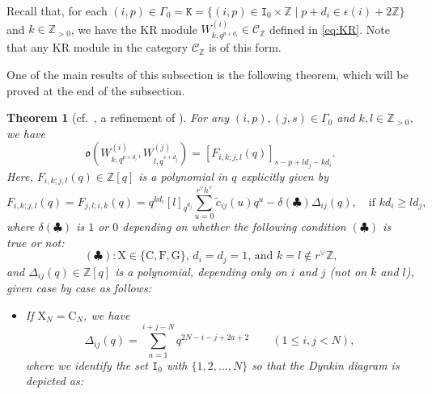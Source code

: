 \documentclass[12pt]{amsart}
\newtheorem{theorem}{Theorem}[section]
\theoremstyle{definition}
\theoremstyle{remark}
\numberwithin{equation}{section}
\begin{document}
 Recall that,  for each $(i,p) \in \Gamma_0=\mathtt K=\{(i,p)\in \mathtt I_0\times \mathbb Z\mid p+d_i\in \epsilon(i)+2\mathbb{Z}\}$ and $k \in \mathbb{Z}_{>0}$, we have the KR module  $W^{(i)}_{k,q^{p+d_i}} \in \mathcal{C}_{\mathbb{Z}}$ defined in \eqref{eq:KR}.
 Note that any KR module in the category $\mathcal{C}_{\mathbb{Z}}$ is of this form.
 
 One of the main results of this subsection is the following theorem, which will be proved at the end of the subsection.
 
\begin{theorem}[{cf.\ \cite[Conjecture 5.17]{FM}, a refinement of \cite[Conjecture 6.7]{Fujita-Oh-2021}}] \label{thm:oKR}
For any $(i,p), (j,s) \in \Gamma_0$ and $k,l \in \mathbb{Z}_{>0}$, we have
\begin{equation}
\mathfrak{o}(W^{(i)}_{k,q^{p+d_i}}, W^{(j)}_{l,q^{s+d_j}}) = 
\left[ F_{i,k;j,l}(q)\right]_{s-p+ld_j-kd_i}.
\end{equation}
Here, $F_{i,k; j,l}(q) \in \mathbb{Z}[q]$ is a polynomial in $q$ explicitly given by 
\begin{equation} \label{eq:Fikjl}
F_{i,k; j,l}(q) = F_{j,l; i,k}(q) = q^{kd_i}[l]_{q^{d_j}} \sum_{u=0}^{r^\vee h^\vee }\widetilde{c}_{ij}(u)q^u - \delta(\clubsuit) \Delta_{ij}(q),
\quad \text{if $kd_i \ge l d_j$},
\end{equation}
where $\delta(\clubsuit)$ is $1$ or $0$ depending on whether the following condition $(\clubsuit)$ is true or not:
\[ (\clubsuit): \text{$\mathrm{X} \in \{ \mathrm{C,F,G}\}$, $d_i=d_j=1$, and $k=l \not \in r^\vee \mathbb{Z}$,}\]
and $\Delta_{ij}(q) \in \mathbb{Z}[q]$ is a polynomial, depending only on $i$ and $j$ (not on $k$ and $l$), given case by case as follows:
\begin{itemize}
\item If $\mathrm{X}_N = \mathrm{C}_N$, we have
\[ 
\Delta_{ij}(q) = \sum_{a=1}^{i+j-N}q^{2N-i-j+2a+2} \qquad (1 \le i,j <N),
\]
where we identify the set $\mathtt{I}_0$ with $\{1,2,\ldots,N\}$ so that the Dynkin diagram is depicted as:
\begin{center}
\end{center}
\end{itemize}
\end{theorem}
\end{document}
